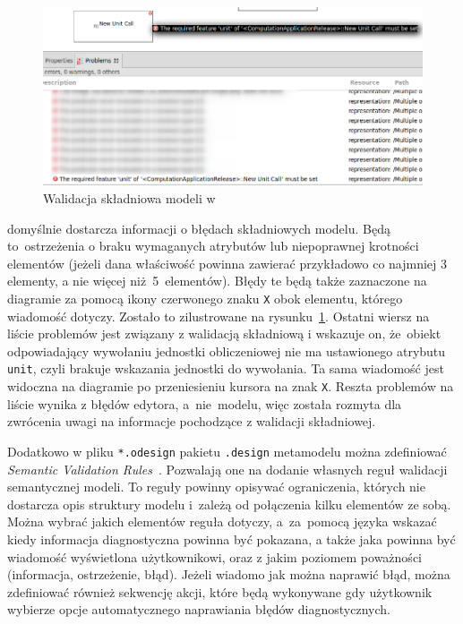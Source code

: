\begin{figure}[!b]
	\centering

	\includegraphics[width=0.95\linewidth]{./images/sirius-desktop-syntax-validation.png}
	\caption{Walidacja składniowa modeli w \SiriusDesktop{}}\label{rys:sirius-desktop-syntax-validation}
\end{figure}

\SiriusDesktop{} domyślnie dostarcza informacji o błędach składniowych
modelu. Będą to~ostrzeżenia o braku wymaganych atrybutów lub niepoprawnej
krotności elementów (jeżeli dana właściwość powinna zawierać przykładowo co
najmniej 3 elementy, a nie więcej niż~5~elementów). Błędy te będą także
zaznaczone na diagramie za pomocą ikony czerwonego znaku \texttt{X} obok
elementu, którego wiadomość dotyczy. Zostało to zilustrowane na
rysunku~\ref{rys:sirius-desktop-syntax-validation}.
Ostatni wiersz na liście problemów jest związany z walidacją składniową i
wskazuje on, że~obiekt odpowiadający wywołaniu jednostki obliczeniowej nie ma
ustawionego atrybutu \texttt{unit}, czyli brakuje wskazania jednostki do
wywołania. Ta sama wiadomość jest widoczna na diagramie po przeniesieniu
kursora na znak \texttt{X}.
Reszta problemów na liście wynika z błędów edytora, a~nie~modelu, więc została
rozmyta dla zwrócenia uwagi na informacje pochodzące z walidacji składniowej.

Dodatkowo w pliku \texttt{*.odesign} pakietu \texttt{.design} metamodelu można
zdefiniować \emph{Semantic Validation
	Rules}~\cite{sirius-desktop-documentation-validation-rules}.
Pozwalają one na dodanie własnych reguł walidacji semantycznej modeli. To
reguły powinny opisywać ograniczenia, których nie dostarcza opis struktury
modelu i~zależą od połączenia kilku elementów ze sobą. Można
wybrać jakich elementów reguła dotyczy, a~za~pomocą języka \AQL{} wskazać
kiedy informacja diagnostyczna powinna być pokazana, a także jaka powinna być
wiadomość wyświetlona użytkownikowi, oraz z jakim poziomem poważności
(informacja, ostrzeżenie, błąd). Jeżeli wiadomo jak można naprawić błąd, można
zdefiniować również sekwencję akcji, które będą wykonywane gdy użytkownik
wybierze
opcje automatycznego naprawiania błędów diagnostycznych.

